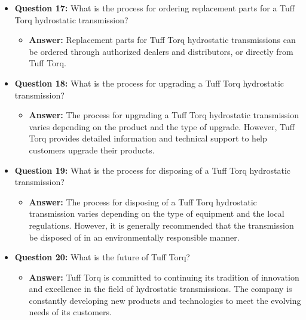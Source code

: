\documentclass{article}
\begin{document}
\begin{itemize}
    \item \textbf{Question 17:} What is the process for ordering replacement parts for a Tuff Torq hydrostatic transmission?
    \begin{itemize}
        \item \textbf{Answer:} Replacement parts for Tuff Torq hydrostatic transmissions can be ordered through authorized dealers and distributors, or directly from Tuff Torq.
    \end{itemize}
    
    \item \textbf{Question 18:} What is the process for upgrading a Tuff Torq hydrostatic transmission?
    \begin{itemize}
        \item \textbf{Answer:} The process for upgrading a Tuff Torq hydrostatic transmission varies depending on the product and the type of upgrade. However, Tuff Torq provides detailed information and technical support to help customers upgrade their products.
    \end{itemize}
    
    \item \textbf{Question 19:} What is the process for disposing of a Tuff Torq hydrostatic transmission?
    \begin{itemize}
        \item \textbf{Answer:} The process for disposing of a Tuff Torq hydrostatic transmission varies depending on the type of equipment and the local regulations. However, it is generally recommended that the transmission be disposed of in an environmentally responsible manner.
    \end{itemize}
    
    \item \textbf{Question 20:} What is the future of Tuff Torq?
    \begin{itemize}
        \item \textbf{Answer:} Tuff Torq is committed to continuing its tradition of innovation and excellence in the field of hydrostatic transmissions. The company is constantly developing new products and technologies to meet the evolving needs of its customers.
    \end{itemize}
\end{itemize}
\end{document}
